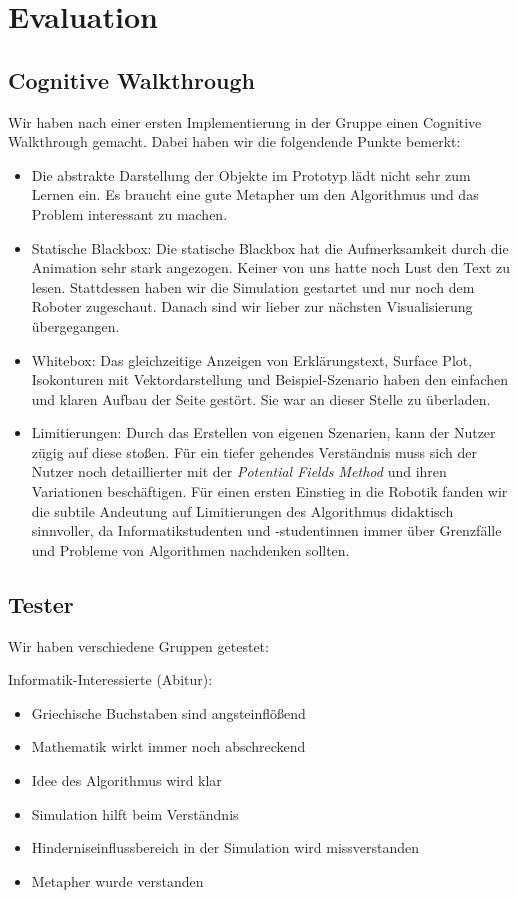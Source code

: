 \section{Evaluation}


\subsection{Cognitive Walkthrough}\label{sec:cogWal}
Wir haben nach einer ersten Implementierung in der Gruppe einen Cognitive Walkthrough gemacht. Dabei haben wir die folgendende Punkte bemerkt:
\begin{itemize}
	\item Die abstrakte Darstellung der Objekte im Prototyp lädt nicht sehr zum Lernen ein. Es braucht eine gute Metapher um den Algorithmus und das Problem interessant zu machen.
	\item Statische Blackbox: Die statische Blackbox hat die Aufmerksamkeit durch die Animation sehr stark angezogen. Keiner von uns hatte noch Lust den Text zu lesen. Stattdessen haben wir die Simulation gestartet und nur noch dem Roboter zugeschaut. Danach sind wir lieber zur nächsten Visualisierung übergegangen.
	\item Whitebox: Das gleichzeitige Anzeigen von Erklärungstext, Surface Plot, Isokonturen mit Vektordarstellung und Beispiel-Szenario haben den einfachen und klaren Aufbau der Seite gestört. Sie war an dieser Stelle zu überladen.
	\item Limitierungen: Durch das Erstellen von eigenen Szenarien, kann der Nutzer zügig auf diese stoßen. Für ein tiefer gehendes Verständnis muss sich der Nutzer noch detaillierter mit der \textit{Potential Fields Method} und ihren Variationen beschäftigen. Für einen ersten Einstieg in die Robotik fanden wir die subtile Andeutung auf Limitierungen des Algorithmus didaktisch sinnvoller, da Informatikstudenten und -studentinnen immer über Grenzfälle und Probleme von Algorithmen nachdenken sollten.
\end{itemize}

\subsection{Tester}

Wir haben verschiedene Gruppen getestet:

Informatik-Interessierte (Abitur):
\begin{itemize}
	\item Griechische Buchstaben sind angsteinflößend
	\item Mathematik wirkt immer noch abschreckend
	\item Idee des Algorithmus wird klar
	\item Simulation hilft beim Verständnis
	\item Hinderniseinflussbereich in der Simulation wird missverstanden
	\item Metapher wurde verstanden
\end{itemize}

